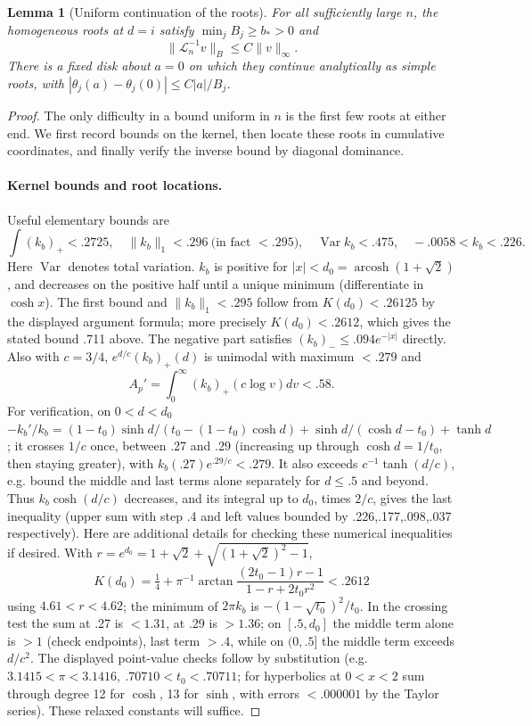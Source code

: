 \documentclass[11pt]{article}
\numberwithin{equation}{section}
\newtheorem{lemma}[theorem]{Lemma}
\theoremstyle{definition}\newtheorem{definition}[theorem]{Definition}
\theoremstyle{remark}\newtheorem{remark}[theorem]{Remark}
\begin{document}
\begin{lemma}[Uniform continuation of the roots]
\label{L:lem:pressure-root-continuation}
For all sufficiently large $n$, the homogeneous roots at $d=i$ satisfy
$\min_jB_j\ge b_*>0$ and
\[
 \|\mathcal L_n^{-1}v\|_B\le C\|v\|_\infty.
\]
There is a fixed disk about $a=0$ on which they continue analytically
as simple roots, with
$|\theta_j(a)-\theta_j(0)|\le C|a|/B_j$.
\end{lemma}
\begin{proof}
The only difficulty in a bound uniform in $n$ is the first few roots
at either end. We first record bounds on the kernel, then locate these
roots in cumulative coordinates, and finally verify the inverse bound
by diagonal dominance.

\paragraph{Kernel bounds and root locations.}
Useful elementary bounds are
\[
 \int(k_b)_+<.2725,\quad\|k_b\|_1<.296\ \text{(in fact }<.295),\quad
 \operatorname{Var} k_b<.475,\quad -.0058<k_b<.226.
\]
Here \(\operatorname{Var}\) denotes total variation. \(k_b\) is positive for \(|x|<d_0=\operatorname{arcosh}(1+\sqrt2)\), and decreases on the positive half until a unique minimum (differentiate in \(\cosh x\)). The first bound and \(\|k_b\|_1<.295\) follow from \(K(d_0)<.26125\) by the displayed argument formula; more precisely \(K(d_0)<.2612\), which gives the stated bound .711 above. The negative part satisfies \((k_b)_-\le .094 e^{-|x|}\) directly. Also with \(c=3/4\), \(e^{d/c}(k_b)_+(d)\) is unimodal with maximum \(<.279\) and
\[
 A_p'=\int_0^\infty(k_b)_+(c\log v)dv<.58 .
\]
For verification, on \(0<d<d_0\)
\(-k_b'/k_b=(1-t_0)\sinh d/(t_0-(1-t_0)\cosh d)+\sinh d/(\cosh d-t_0)+\tanh d\); it crosses \(1/c\) once, between .27 and .29 (increasing up through \(\cosh d=1/t_0\), then staying greater), with \(k_b(.27)e^{.29/c}<.279\). It also exceeds \(c^{-1}\tanh(d/c)\), e.g. bound the middle and last terms alone separately for \(d\le .5\) and beyond. Thus \(k_b\cosh(d/c)\) decreases, and its integral up to \(d_0\), times \(2/c\), gives the last inequality (upper sum with step .4 and left values bounded by .226,.177,.098,.037 respectively). Here are additional details for checking these numerical inequalities if desired. With \(r=e^{d_0}=1+\sqrt2+\sqrt{(1+\sqrt2)^2-1}\),
\[
 K(d_0)=\tfrac14+\pi^{-1}\arctan\frac{(2t_0-1)r-1}{1-r+2t_0 r^2}<.2612
\]
using \(4.61<r<4.62\); the minimum of \(2\pi k_b\) is \(-(1-\sqrt{t_0})^2/t_0\). In the crossing test the sum at .27 is \(<1.31\), at .29 is \(>1.36\); on \([.5,d_0]\) the middle term alone is \(>1\) (check endpoints), last term \(>.4\), while on \((0,.5]\) the middle term exceeds \(d/c^2\). The displayed point-value checks follow by substitution (e.g. \(3.1415<\pi<3.1416,\ .70710<t_0<.70711\); for hyperbolics at \(0<x<2\) sum through degree 12 for \(\cosh\), 13 for \(\sinh\), with errors \(<.000001\) by the Taylor series). These relaxed constants will suffice.


\end{proof}
\end{document}
